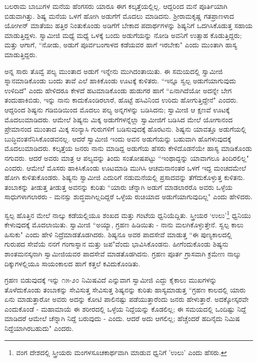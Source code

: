 ಬಲರಾಮ ಬಾಬುಗಳ ಮನೆಯ ಹೆಂಗಸರು ಯಾರೂ ಈಗ ಕಲ್ಕತ್ತೆಯಲ್ಲಿಲ್ಲ. ಆದ್ದರಿಂದ ಮನೆ ಪೂರ್ತಿಯಾಗಿ ಬಿಡುವಾಗಿತ್ತು. ಶಿಷ್ಯ ಮನೆಯ ಒಳಗೆ ಹೋಗಿ ಅಡುಗೆಗೆ ಮೊದಲು ಮಾಡಿದನು. ಶ‍್ರೀರಾಮಕೃಷ್ಣ ಗತಪ್ರಾಣಳಾದ ಯೋಗೀನ್ ಮಾತೆಯು ಹತ್ತಿರ ನಿಂತುಕೊಂಡು ಅಡಿಗೆಗೆ ಬೇಕಾದ ಪದಾರ್ಥಗಳನ್ನು ಶಿಷ್ಯನಿಗೆ ಒದಗಿಸಿಕೊಡುತ್ತ ಸಹಾಯ ಮಾಡುತ್ತಿದ್ದಳು. ಸ್ವಾಮೀಜಿ ಮಧ್ಯೆ ಮಧ್ಯೆ ಒಳಕ್ಕೆ ಬಂದು ಅಡುಗೆಯನ್ನು ನೋಡಿ ಅವನಿಗೆ ಉತ್ಸಾಹ ಕೊಡುತ್ತಿದ್ದರು; ಮತ್ತು ಆಗಾಗೆ, “ನೋಡು, ಅಡುಗೆ ಪೂರ್ವಬಂಗಾಳದ ಕಡೆಯವರ ಹಾಗೆ ಇರಬೇಕು" ಎಂದು ಮುಂತಾಗಿ ಹಾಸ್ಯ ಮಾಡುತ್ತಿದ್ದರು.

ಅನ್ನ ಸಾರು ತೊವ್ವೆ ಪಲ್ಯ ಮುಂತಾದ ಅಡುಗೆ ಇನ್ನೇನು ಮುಗಿದಂತಾಯಿತು. ಈ ಸಮಯದಲ್ಲಿ ಸ್ವಾಮೀಜಿ ಸ್ನಾನಮಾಡಿಕೊಂಡು ಬಂದು ತಾವೆ ಎಲೆ ಹಾಕಿಕೊಂಡು ಊಟಕ್ಕೆ ಕುಳಿತರು. “ಇನ್ನೂ ಸ್ವಲ್ಪ ಅಡುಗೆಯಾಗುವುದು ಉಳಿದಿದೆ" ಎಂದು ಹೇಳಿದರೂ ಕೇಳದೆ ಹಟಮಾಡಿಕೊಂಡು ಹುಡುಗರ ಹಾಗೆ “ಏನಾಗಿದೆಯೋ ಅದನ್ನೇ ಬೇಗ ತಂದುಹಾಕಿಬಿಡು, ಇನ್ನು ನಾನು ಕಾದುಕೊಂಡಿರಲಾರೆ, ಹೊಟ್ಟೆ ಹಸಿವಿನಿಂದ ಉರಿದು ಹೋಗುತ್ತಿದ್ದೇನೆ" ಎಂದರು. ಆದ್ದರಿಂದ ಶಿಷ್ಯನು ಗಡಿಬಿಡಿಯಿಂದ ಮೊದಲು ಪಲ್ಯ ಅನ್ನಗಳನ್ನು ಬಡಿಸಿದನು; ಸ್ವಾಮೀಜಿ ಆ ಕ್ಷಣವೆ ಊಟಕ್ಕೆ ಮೊದಲುಮಾಡಿದರು. ಆಮೇಲೆ ಶಿಷ್ಯನು ಮಿಕ್ಕ ಅಡುಗೆಗಳನ್ನೆಲ್ಲಾ ಸ್ವಾಮೀಜಿಗೆ ಬಡಿಸಿದ ಮೇಲೆ ಯೋಗಾನಂದ ಪ್ರೇಮಾನಂದ ಮುಂತಾದ ಮಿಕ್ಕ ಸಂನ್ಯಾಸಿ ಗುರುಗಳಿಗೆ ಬಡಿಸುವುದಕ್ಕೆ ಹೊರಟನು. ಶಿಷ್ಯನು ಯಾವತ್ತೂ ಅಡುಗೆಯಲ್ಲಿ ಬುದ್ಧಿವಂತನೆನಿಸಿಕೊಂಡವನಲ್ಲ. ಆದರೆ ಸ್ವಾಮೀಜಿ ಇಂದು ಅವನ ಅಡುಗೆಯನ್ನು ಬಹುವಾಗಿ ಹೊಗಳುವುದಕ್ಕೆ ಮೊದಲುಮಾಡಿದರು. ಕಲ್ಕತ್ತೆಯ ಜನರು ನಾನು ಮಾಡಿದ್ದ ಅಡುಗೆಯ ಹೆಸರು ಕೇಳಿದೊಡನೆಯೇ ಹಾಸ್ಯ ಮಾಡಿಕೊಂಡು ನಗುವರು. ಆದರೆ ಅವರು ಮಾತ್ರ ಆ ಪಲ್ಯವನ್ನು ತಿಂದು ಸಂತೋಷಪಟ್ಟು “ಇಂಥಾದ್ದನ್ನು ಯಾವಾಗಲೂ ತಿಂದಿರಲಿಲ್ಲ" ಎಂದರು. ಆಮೇಲೆ ಮೊಸರು ಹಾಕಿಸಿಕೊಂಡು ಊಟಮಾಡಿ ಮುಗಿಸಿ ಆಚಮನಾನಂತರ ಒಳಗೆ ಇದ್ದ ಮಂಚದಮೇಲೆ ಹೋಗಿ ಕುಳಿತುಕೊಂಡರು. ಶಿಷ್ಯನು ಸ್ವಾಮೀಜಿ ಎದುರಿಗೆ ನಡುಮನೆಯಲ್ಲಿ ಪ್ರಸಾದವನ್ನು ತೆಗೆದುಕೊಳ್ಳುತ್ತ ಕುಳಿತನು. ತಂಬಾಕನ್ನು ತೀಡುತ್ತ ತೀಡುತ್ತ ಅವನನ್ನು ಕುರಿತು “ಯಾರು ಚೆನ್ನಾಗಿ ಅಡುಗೆ ಮಾಡಲಾರರೊ ಅವರು ಒಳ್ಳೆಯ ಸಾಧುಗಳಾಗಲಾರರು - ಮನಸ್ಸು ಶುದ್ಧವಾಗಿಲ್ಲದಿದ್ದರೆ ಒಳ್ಳೆಯ ರುಚಿಯಾದ ಅಡುಗೆಯಾಗುವುದಿಲ್ಲ" ಎಂದು ಹೇಳಿದರು.

ಸ್ವಲ್ಪ ಹೊತ್ತಿನ ಮೇಲೆ ನಾಲ್ಕು ಕಡೆಯಲ್ಲಿಯೂ ಶಂಖದ ಮತ್ತು ಗಂಟೆಯ ಧ್ವನಿಯೆದ್ದಿತು. ಸ್ತ್ರೀಯರ ‘ಉಲು’\footnote{ವಂಗ ದೇಶದಲ್ಲಿ ಸ್ತ್ರೀಯರು ಮಂಗಳಸೂಚಕಾರ್ಥವಾಗಿ ಮಾಡುವ ಧ್ವನಿಗೆ 'ಉಲು' ಎಂದು ಹೆಸರು.} ಧ್ವನಿಯು ಕೇಳುವುದಕ್ಕೆ ಮೊದಲಾಯಿತು. ಸ್ವಾಮೀಜಿ “ಅಯ್ಯಾ, ಗ್ರಹಣ ಹಿಡಿಯಿತು - ನಾನು ಮಲಗಿಕೊಳ್ಳುತ್ತೇನೆ. ಸ್ವಲ್ಪ ಕಾಲು ಹಿಸುಕು" ಎಂದು ಹೇಳಿ ನಿದ್ರೆಮಾಡತೊಡಗಿದರು. ಶಿಷ್ಯನೂ ಅವರ ಪಾದಸೇವೆ ಮಾಡುತ್ತ “ಈ ಪುಣ್ಯಕಾಲದಲ್ಲಿ ಗುರುಪದ ಸೇವೆಯೆ ನನಗೆ ಗಂಗಾಸ್ನಾನ ಮತ್ತು ಜಪ"ವೆಂದು ಭಾವಿಸಿಕೊಂಡನು. ಹೀಗೆಂದುಕೊಂಡು ಶಿಷ್ಯನು ಶಾಂತಮನಸ್ಕನಾಗಿ ಸ್ವಾಮೀಜಿಯವರ ಪಾದಸೇವೆ ಮಾಡತೊಡಗಿದನು. ಗ್ರಹಣ ಪೂರ್ತ ಗ್ರಾಸವಾಗಿ ಕ್ರಮೇಣ ನಾಲ್ಕು ದಿಕ್ಕುಗಳಲ್ಲಿಯೂ ಸಾಯಂಕಾಲದ ಹಾಗೆ ಕತ್ತಲೆ ಕವಿದುಕೊಂಡಿತು.

ಗ್ರಹಣ ಬಿಡುವುದಕ್ಕೆ ಇನ್ನು ೧೫-೨೦ ನಿಮಿಷವಿದೆ ಎನ್ನುವಾಗ ಸ್ವಾಮೀಜಿ ಎದ್ದು ಕೈಕಾಲು ಮುಖಗಳನ್ನು ತೊಳೆದುಕೊಂಡು ತಂಬಾಕನ್ನು ಸೇವಿಸುತ್ತ ಸೇವಿಸುತ್ತ ಶಿಷ್ಯನನ್ನು ಕುರಿತು ಹಾಸ್ಯಮಾಡುತ್ತ “ಗ್ರಹಣ ಕಾಲದಲ್ಲಿ ಯಾರು ಏನು ಮಾಡುತ್ತಾರೋ ಅವರು ಅದನ್ನು ಕೋಟಿ ಪಾಲಿನಷ್ಟು ಪಡೆಯುತ್ತಾರೆಂದು ಜನರು ಹೇಳುತ್ತಾರೆ. ಅದಕ್ಕೋಸ್ಕರವೇ ಎಂದುಕೊಂಡೆ - ಮಹಾಮಾಯೆ ಈ ಶರೀರದಲ್ಲಿ ಒಳ್ಳೆಯ ನಿದ್ದೆಯನ್ನು ಕೊಡಲಿಲ್ಲ; ಈ ಸಮಯದಲ್ಲಿ ಒಂದಿಷ್ಟು ನಿದ್ದೆ ಮಾಡಿದರೆ ಆಮೇಲೆ ಚೆನ್ನಾಗಿ ನಿದ್ದೆ ಬರುವುದು - ಎಂದು. ಆದರೆ ಅದು ಆಗಲಿಲ್ಲ; ಹೆಚ್ಚೆಂದರೆ ಹದಿನೈದು ನಿಮಿಷ ನಿದ್ದೆಯಾಗಿರಬಹುದು" ಎಂದರು.

